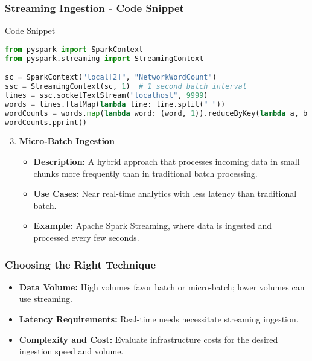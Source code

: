 \documentclass[aspectratio=169]{beamer}
\begin{document}
\begin{frame}[fragile]
  \frametitle{Streaming Ingestion - Code Snippet}
  \begin{block}{Code Snippet}
  \begin{lstlisting}[language=Python]
from pyspark import SparkContext
from pyspark.streaming import StreamingContext

sc = SparkContext("local[2]", "NetworkWordCount")
ssc = StreamingContext(sc, 1)  # 1 second batch interval
lines = ssc.socketTextStream("localhost", 9999)
words = lines.flatMap(lambda line: line.split(" "))
wordCounts = words.map(lambda word: (word, 1)).reduceByKey(lambda a, b: a + b)
wordCounts.pprint()
  \end{lstlisting}
  \end{block}

  \begin{enumerate}
    \setcounter{enumi}{2}
    \item \textbf{Micro-Batch Ingestion}
      \begin{itemize}
        \item \textbf{Description:} A hybrid approach that processes incoming data in small chunks more frequently than in traditional batch processing.
        \item \textbf{Use Cases:} Near real-time analytics with less latency than traditional batch.
        \item \textbf{Example:} Apache Spark Streaming, where data is ingested and processed every few seconds.
      \end{itemize}
  \end{enumerate}
\end{frame}

\begin{frame}[fragile]
  \frametitle{Choosing the Right Technique}
  \begin{itemize}
    \item \textbf{Data Volume:} High volumes favor batch or micro-batch; lower volumes can use streaming.
    \item \textbf{Latency Requirements:} Real-time needs necessitate streaming ingestion.
    \item \textbf{Complexity and Cost:} Evaluate infrastructure costs for the desired ingestion speed and volume.
  \end{itemize}
\end{frame}
\end{document}
